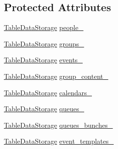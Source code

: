 \subsection*{Protected Attributes}
\begin{DoxyCompactItemize}
\item 
\hyperlink{classstorage_1_1TableDataStorage}{TableDataStorage} \hyperlink{classstorage_1_1DataStorage_a8c32de002329fa6018a0957c925cf183}{people\_\-}
\item 
\hyperlink{classstorage_1_1TableDataStorage}{TableDataStorage} \hyperlink{classstorage_1_1DataStorage_a08dbec98bdd6b7c3e6623a8bbe72235c}{groups\_\-}
\item 
\hyperlink{classstorage_1_1TableDataStorage}{TableDataStorage} \hyperlink{classstorage_1_1DataStorage_a16f699e52132096d7e8ec8d43c73ad1f}{events\_\-}
\item 
\hyperlink{classstorage_1_1TableDataStorage}{TableDataStorage} \hyperlink{classstorage_1_1DataStorage_ac49bf760dd1492eb566e7bbbf9d84743}{group\_\-content\_\-}
\item 
\hyperlink{classstorage_1_1TableDataStorage}{TableDataStorage} \hyperlink{classstorage_1_1DataStorage_adc094f1bdcad1fd0940c947d2b0529b9}{calendars\_\-}
\item 
\hyperlink{classstorage_1_1TableDataStorage}{TableDataStorage} \hyperlink{classstorage_1_1DataStorage_af9a0216e83d32b996086a0b15a5281ab}{queues\_\-}
\item 
\hyperlink{classstorage_1_1TableDataStorage}{TableDataStorage} \hyperlink{classstorage_1_1DataStorage_a19686eeb613ff2ade96fd557b26627f1}{queues\_\-bunches\_\-}
\item 
\hyperlink{classstorage_1_1TableDataStorage}{TableDataStorage} \hyperlink{classstorage_1_1DataStorage_a96b081918351159d88994b382f1b97e2}{event\_\-templates\_\-}
\end{DoxyCompactItemize}


